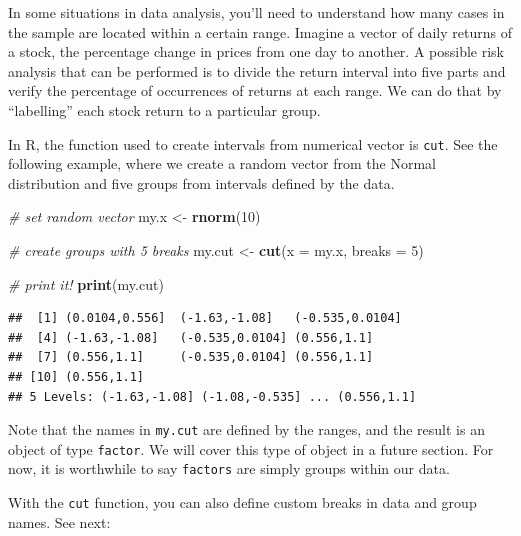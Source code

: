 \documentclass[11pt,]{book}
\newenvironment{Shaded}{\begin{snugshade}}{\end{snugshade}}
\newcommand{\KeywordTok}[1]{\textcolor[rgb]{0.27,0.27,0.27}{\textbf{#1}}}
\newcommand{\DataTypeTok}[1]{\textcolor[rgb]{0.27,0.27,0.27}{#1}}
\newcommand{\DecValTok}[1]{\textcolor[rgb]{0.06,0.06,0.06}{#1}}
\newcommand{\StringTok}[1]{\textcolor[rgb]{0.5,0.5,0.5}{#1}}
\newcommand{\CommentTok}[1]{\textcolor[rgb]{0.56,0.35,0.01}{\textit{#1}}}
\newcommand{\NormalTok}[1]{#1}
\begin{document}
In some situations in data analysis, you'll need to understand how many
cases in the sample are located within a certain range. Imagine a vector
of daily returns of a stock, the percentage change in prices from one
day to another. A possible risk analysis that can be performed is to
divide the return interval into five parts and verify the percentage of
occurrences of returns at each range. We can do that by ``labelling''
each stock return to a particular group.

In R, the function used to create intervals from numerical vector is
\texttt{cut}. See the following example, where we create a random vector
from the Normal distribution and five groups from intervals defined by
the data. 

\begin{Shaded}
\begin{Highlighting}[]
\CommentTok{# set random vector}
\NormalTok{my.x <-}\StringTok{ }\KeywordTok{rnorm}\NormalTok{(}\DecValTok{10}\NormalTok{)}

\CommentTok{# create groups with 5 breaks}
\NormalTok{my.cut <-}\StringTok{ }\KeywordTok{cut}\NormalTok{(}\DataTypeTok{x =}\NormalTok{ my.x, }\DataTypeTok{breaks =} \DecValTok{5}\NormalTok{)}

\CommentTok{# print it!}
\KeywordTok{print}\NormalTok{(my.cut)}
\end{Highlighting}
\end{Shaded}

\begin{verbatim}
##  [1] (0.0104,0.556]  (-1.63,-1.08]   (-0.535,0.0104]
##  [4] (-1.63,-1.08]   (-0.535,0.0104] (0.556,1.1]    
##  [7] (0.556,1.1]     (-0.535,0.0104] (0.556,1.1]    
## [10] (0.556,1.1]    
## 5 Levels: (-1.63,-1.08] (-1.08,-0.535] ... (0.556,1.1]
\end{verbatim}

Note that the names in \texttt{my.cut} are defined by the ranges, and
the result is an object of type \texttt{factor}. We will cover this type
of object in a future section. For now, it is worthwhile to say
\texttt{factors} are simply groups within our data.

With the \texttt{cut} function, you can also define custom breaks in
data and group names. See next:
\end{document}
